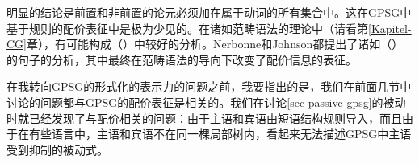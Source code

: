 \eal
{}
\zl
明显的结论是前置和非前置的论元必须加在属于动词的所有集合中。这在GPSG中基于规则的配价表征中是极为少见的。在诸如范畴语法的理论中（请看第\ref{Kapitel-CG}章），有可能构成（）中较好的分析\citep{Geach70a}。Nerbonne和Johnson都提出了诸如（）的句子的分析，其中最终在范畴语法的导向下改变了配价信息的表征。

在我转向GPSG的形式化的表示力的问题之前，我要指出的是，我们在前面几节中讨论的问题都与GPSG的配价表征是相关的。我们在讨论\ref{sec-passive-gpsg}的被动时就已经发现了与配价相关的问题：由于主语和宾语由短语结构规则导入，而且由于在有些语言中，主语和宾语不在同一棵局部树内，看起来无法描述GPSG中主语受到抑制的被动式。

